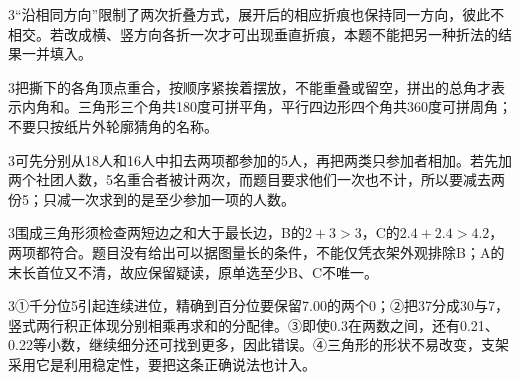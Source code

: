 \documentclass[multi=snippet,border={5bp 20bp 5bp 5bp}]{standalone}
\newenvironment{snippet}[3]{\begin{minipage}{#1bp}\color{answerred}\fontsize{#2}{#3}\selectfont\raggedright}{\end{minipage}}
\begin{document}
\begin{snippet}{505}{11.5}{14}\begin{multicols}{3}\raggedcolumns “沿相同方向”限制了两次折叠方式，展开后的相应折痕也保持同一方向，彼此不相交。若改成横、竖方向各折一次才可出现垂直折痕，本题不能把另一种折法的结果一并填入。\end{multicols}\end{snippet}
\begin{snippet}{505}{11.5}{14}\begin{multicols}{3}\raggedcolumns 把撕下的各角顶点重合，按顺序紧挨着摆放，不能重叠或留空，拼出的总角才表示内角和。三角形三个角共180度可拼平角，平行四边形四个角共360度可拼周角；不要只按纸片外轮廓猜角的名称。\end{multicols}\end{snippet}
\begin{snippet}{505}{11.5}{14}\begin{multicols}{3}\raggedcolumns 可先分别从18人和16人中扣去两项都参加的5人，再把两类只参加者相加。若先加两个社团人数，5名重合者被计两次，而题目要求他们一次也不计，所以要减去两份5；只减一次求到的是至少参加一项的人数。\end{multicols}\end{snippet}
\begin{snippet}{505}{11.5}{14}\begin{multicols}{3}\raggedcolumns 围成三角形须检查两短边之和大于最长边，B的\(2+3>3\)\allowbreak ，C的\(2.4+2.4>4.2\)\allowbreak ，两项都符合。题目没有给出可以据图量长的条件，不能仅凭衣架外观排除B；A的末长首位又不清，故应保留疑读，原单选至少B、C不唯一。\end{multicols}\end{snippet}
\begin{snippet}{505}{11.5}{14}\begin{multicols}{3}\raggedcolumns ①千分位5引起连续进位，精确到百分位要保留7.00的两个0；②把37分成30与7，竖式两行积正体现分别相乘再求和的分配律。③即使0.3在两数之间，还有0.21、0.22等小数，继续细分还可找到更多，因此错误。④三角形的形状不易改变，支架采用它是利用稳定性，要把这条正确说法也计入。\end{multicols}\end{snippet}
\end{document}
